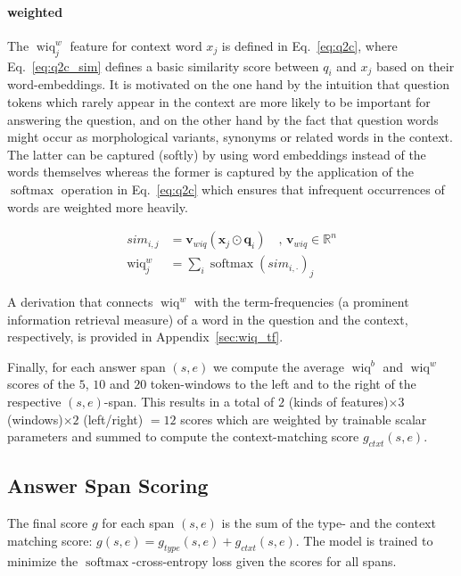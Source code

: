 \documentclass[11pt,a4paper]{article}
\begin{document}
\paragraph{weighted} The $\operatorname{wiq}^w_j$ feature for context word $x_j$ is defined in Eq.~\ref{eq:q2c}, where Eq.~\ref{eq:q2c_sim} defines a basic similarity score between $q_i$ and $x_j$ based on their word-embeddings. It is motivated on the one hand by the intuition that question tokens which rarely appear in the context are more likely to be important for answering the question, and on the other hand by the fact that question words might occur as morphological variants, synonyms or related words in the context. The latter can be captured (softly) by using word embeddings instead of the words themselves whereas the former is captured by the application of the $\operatorname{softmax}$ operation in Eq.~\ref{eq:q2c} which ensures that infrequent occurrences of words are weighted more heavily.

\begin{align}
    sim_{i,j} &= \boldsymbol{v}_{wiq} ( \boldsymbol{x}_j \odot \boldsymbol{q}_i ) \quad , \, \boldsymbol{v}_{wiq} \in \mathbb{R}^n \label{eq:q2c_sim} \\
    \operatorname{wiq}^w_j &= \sum_i \operatorname{softmax}( sim_{i,\cdot} )_j \label{eq:q2c}
\end{align}

A derivation that connects $\operatorname{wiq}^w$ with the term-frequencies (a prominent information retrieval measure) of a word in the question and the context, respectively, is provided in Appendix~\ref{sec:wiq_tf}. 


Finally, for each answer span $(s,e)$ we compute the average $\operatorname{wiq}^b$ and $\operatorname{wiq}^w$ scores of the $5$, $10$ and $20$ token-windows to the left and to the right of the respective $(s,e)$-span. This results in a total of $2$ (kinds of features)$\times 3$ (windows)$\times 2$ (left/right) $=12$ scores which are weighted by trainable scalar parameters and summed to compute the context-matching score $g_{ctxt}(s,e)$.

\subsection{Answer Span Scoring}

The final score $g$ for each span $(s,e)$ is the sum of the type- and the context matching score: $g(s,e) = g_{type}(s,e) + g_{ctxt}(s,e)$. The model is trained to minimize the $\operatorname{softmax}$-cross-entropy loss given the scores for all spans.
\end{document}
